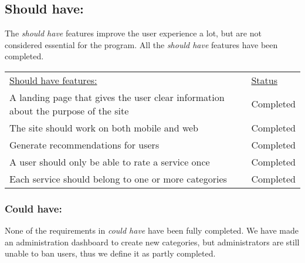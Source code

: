 \subsection{Should have:}
The \textit{should have} features improve the user experience a lot, but are not considered essential for the program.
All the \textit{should have} features have been completed.

\begin{table}[h]
    \begin{tabularx}{\textwidth}{|X|l|}
    \underline{Should have features:}                                                                 & \underline{Status} \\
    A landing page that gives the user clear information about the purpose of the site                & Completed \\
    The site should work on both mobile and web                                                       & Completed \\
    Generate recommendations for users                                                                & Completed \\
    A user should only be able to rate a service once                                                 & Completed \\
    Each service should belong to one or more categories                                              & Completed \\
   \end{tabularx}
\end{table}

\subsubsection{Could have:}
None of the requirements in \textit{could have} have been fully completed.
We have made an administration dashboard to create new categories, but administrators are still unable to ban users, thus we define it as partly completed.

